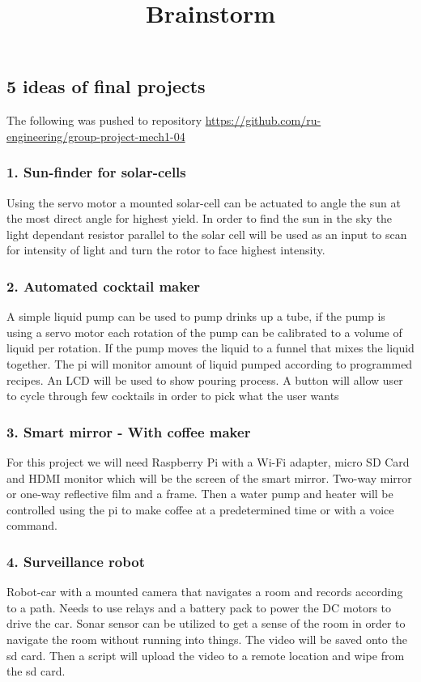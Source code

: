 \documentclass{article}
\title{Brainstorm}
\begin{document}
\maketitle

\subsection*{5 ideas of final projects}
The following was pushed to repository \url{https://github.com/ru-engineering/group-project-mech1-04}
\subsubsection*{1. Sun-finder for solar-cells}
Using the servo motor a mounted solar-cell can be actuated to angle the sun at the most direct angle for highest yield. In order to find the sun in the sky the light dependant resistor parallel to the solar cell will be used as an input to scan for intensity of light and turn the rotor to face highest intensity. 
\subsubsection*{2. Automated cocktail maker}
A simple liquid pump can be used to pump drinks up a tube, if the pump is using a servo motor each rotation of the pump can be calibrated to a volume of liquid per rotation. If the pump moves the liquid to a funnel that mixes the liquid together. The pi will monitor amount of liquid pumped according to programmed recipes. An LCD will be used to show pouring process. A button will allow user to cycle through few cocktails in order to pick what the user wants


\subsubsection*{3. Smart mirror - With coffee maker}
For this project we will need Raspberry Pi with a Wi-Fi adapter, micro SD Card
and HDMI monitor which will be the screen of the smart mirror. Two-way mirror or one-way reflective film and a frame.
Then a water pump and heater will be controlled using the pi to make coffee at a predetermined time or with a voice command.
\subsubsection*{4. Surveillance robot}
Robot-car with a mounted camera that navigates a room and records according to a path. Needs to use relays and a battery pack to power the DC motors to drive the car. Sonar sensor can be utilized to get a sense of the room in order to navigate the room without running into things. The video will be saved onto the sd card. Then a script will upload the video to a remote location and wipe from the sd card. 
\end{document}
